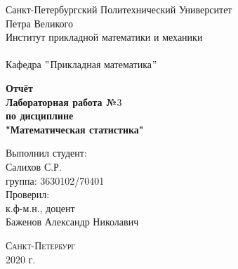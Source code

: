 \documentclass[a4]{article}
\begin{document}
	\def\contentsname{\LARGE{Содержание}}
	\thispagestyle{empty}
	\begin{center} 
		\vspace{2cm} 
		{\Large \sc Санкт-Петербургский Политехнический Университет}\\
		\vspace{2mm}
		{\Large\sc Петра Великого}\\
		\vspace{1cm}
		{\large \sc Институт прикладной математики и механики\\ 
			\vspace{0.5mm}
			\textsc{}}\\ 
		\vspace{0.5mm}
		{\large\sc Кафедра $"$Прикладная математика$"$}\\
		\vspace{15mm}
		
		
		{\sc \textbf{Отчёт\\
			Лабораторная работа №$3$\\
			по дисциплине\\
			"Математическая статистика"}
			\vspace{6mm}
			
		}
		\vspace*{2mm}
		
		
		\begin{flushleft}
			\vspace{4cm}
			\sc Выполнил студент:\\
			\sc Салихов С.Р.\\
			\sc группа: 3630102/70401\\
			\vspace{1cm}
			\sc Проверил:\\
			\sc к.ф-м.н., доцент\\
			\sc Баженов Александр Николавич
			\vspace{20mm}
		\end{flushleft}
	\end{center} 
	\begin{center}
		\vfill {\large\textsc{Санкт-Петербург}}\\ 
		2020 г.
	\end{center}
	
	\newpage
	\pagestyle{plain}
	
	
	
\end{document}
